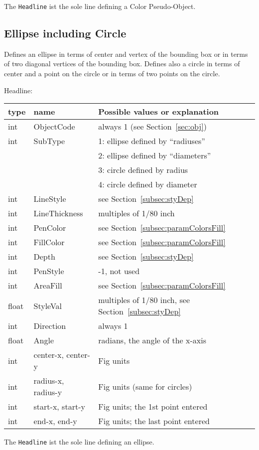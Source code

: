 \documentclass[10pt, a4paper]{article}
\begin{document}
The {\tt Headline} ist the sole line defining a Color Pseudo-Object. 


\subsection{Ellipse including Circle}\label{subsec:ellipse}

Defines an ellipse in terms of center and vertex of the bounding box 
or in terms of two diagonal vertices of the bounding box. 
Defines also a circle in terms of center and a point on the circle 
or in terms of two points on the circle. 

\noindent
Headline: \\
%
\begin{tabular}{|lll|}
\hline
type  & name                & Possible values or explanation \\
\hline
\hline
int   &  ObjectCode         & always 1 (see Section~\ref{sec:obj}) \\
int   &  SubType            & 1: ellipse defined by ``radiuses'' \\
&&                            2: ellipse defined by ``diameters'' \\
&&                            3: circle defined by radius \\
&&                            4: circle defined by diameter \\
int   &  LineStyle          & see Section~\ref{subsec:styDep} \\
int   &  LineThickness      & multiples of 1/80 inch \\
int   &  PenColor           & see Section~\ref{subsec:paramColorsFill} \\
int   &  FillColor          & see Section~\ref{subsec:paramColorsFill} \\
int   &  Depth              & see Section~\ref{subsec:styDep} \\
int   &  PenStyle           & -1, not used \\
int   &  AreaFill           & see Section~\ref{subsec:paramColorsFill} \\
float &  StyleVal           & multiples of 1/80 inch, 
                              see Section~\ref{subsec:styDep}  \\
int   &  Direction          & always 1 \\
float &  Angle              & radians, the angle of the x-axis \\
int   &  center-x, center-y & Fig units \\
int   &  radius-x, radius-y & Fig units (same for circles) \\
int   &  start-x, start-y   & Fig units; the 1st point entered \\
int   &  end-x, end-y       & Fig units; the last point entered \\
\hline
\end{tabular}
%
The {\tt Headline} ist the sole line defining an ellipse. 
\end{document}
